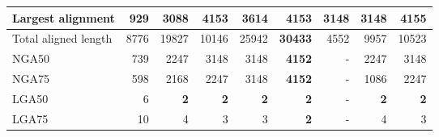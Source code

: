 \documentclass[12pt,a4paper]{article}
\begin{document}
\begin{table}[ht]
\begin{center}
\begin{tabular}{|l*{8}{|r}|}
Largest alignment & 929 & 3088 & 4153 & 3614 & 4153 & 3148 & 3148 & {\bf 4155} \\ \hline
Total aligned length & 8776 & 19827 & 10146 & 25942 & {\bf 30433} & 4552 & 9957 & 10523 \\ \hline
NGA50 & 739 & 2247 & 3148 & 3148 & {\bf 4152} & - & 2247 & 3148 \\ \hline
NGA75 & 598 & 2168 & 2247 & 3148 & {\bf 4152} & - & 1086 & 2247 \\ \hline
LGA50 & 6 & {\bf 2} & {\bf 2} & {\bf 2} & {\bf 2} & - & {\bf 2} & {\bf 2} \\ \hline
LGA75 & 10 & 4 & 3 & 3 & {\bf 2} & - & 4 & 3 \\ \hline
\end{tabular}
\end{center}
\end{table}
\end{document}
